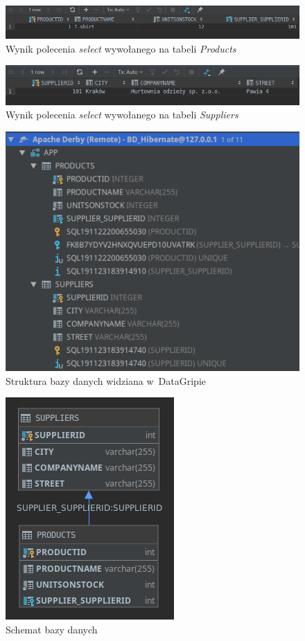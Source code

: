 \documentclass[12pt, a4paper]{mwart}
\begin{document}
\begin{figure}[ht]
  \centering
  \includegraphics[scale=0.5]{III/3-2.png}
  \caption{Wynik polecenia \textit{select} wywołanego na tabeli \textit{Products}}
  \label{rys:3.2}
\end{figure}

\begin{figure}[ht]
  \centering
  \includegraphics[scale=0.5]{III/3-3.png}
  \caption{Wynik polecenia \textit{select} wywołanego na tabeli \textit{Suppliers}}
  \label{rys:3.3}
\end{figure}

\begin{figure}[ht]
  \centering
  \includegraphics[scale=0.5]{III/3-4.png}
  \caption{Struktura bazy danych widziana w~DataGripie}
  \label{rys:3.4}
\end{figure}

\begin{figure}[ht]
  \centering
  \includegraphics[scale=0.5]{III/3-5.png}
  \caption{Schemat bazy danych}
  \label{rys:3.5}
\end{figure}
\end{document}
